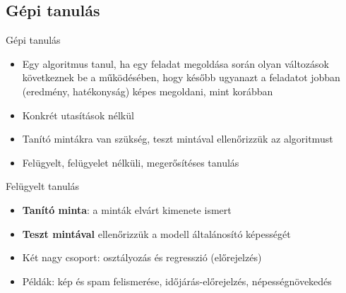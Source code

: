 \subsection{Gépi tanulás}
\begin{frame}{Gépi tanulás}
    \begin{itemize}
        \item Egy algoritmus tanul, ha egy feladat megoldása során olyan változások következnek be a működésében, hogy később ugyanazt a feladatot jobban (eredmény, hatékonyság) képes megoldani, mint korábban
        \item Konkrét utasítások nélkül
        \item Tanító mintákra van szükség, teszt mintával ellenőrizzük az algoritmust
        \item Felügyelt, felügyelet nélküli, megerősítéses tanulás
    \end{itemize}
\end{frame}

\begin{frame}{Felügyelt tanulás}
    \begin{itemize}
        \item {\bf Tanító minta}: a minták elvárt kimenete ismert
        \item {\bf Teszt mintával} ellenőrizzük a modell általánosító képességét
        \item Két nagy csoport: osztályozás és regresszió (előrejelzés)
        \item Példák: kép és spam felismerése, időjárás-előrejelzés, népességnövekedés
    \end{itemize}
\end{frame}

